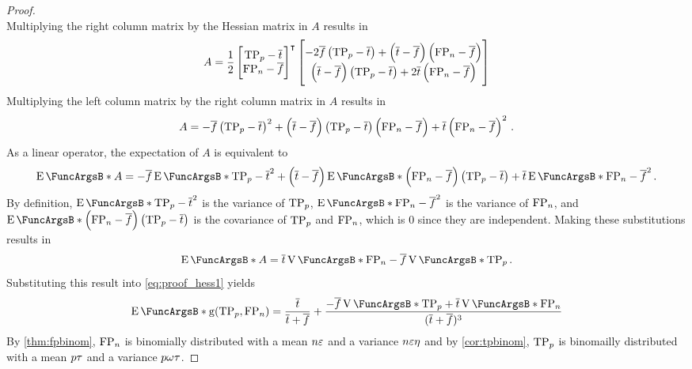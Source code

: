 \documentclass[10pt,final,hidelinks]{article}
\numberwithin{equation}{section}
\begin{document}
{\begin{proof}
\begin{equation}
\end{equation}
Multiplying the right column matrix by the Hessian matrix in $A$ results in
\begin{equation}
    A = \frac{1}{2}
    \begin{bmatrix}
        \mathrm{TP}_p - \overline{t}\\
        \mathrm{FP}_n - \overline{f}
    \end{bmatrix}^{\intercal}
    \begin{bmatrix}
        -2 \overline{f} \left(\mathrm{TP}_p - \overline{t}\right) + \left(\overline{t}-\overline{f}\right)\left(\mathrm{FP}_n - \overline{f}\right)\\
        \left(\overline{t}-\overline{f}\right)\left(\mathrm{TP}_p - \overline{t}\right) + 2 \overline{t}\left(\mathrm{FP}_n - \overline{f}\right)
    \end{bmatrix}
\end{equation}
Multiplying the left column matrix by the right column matrix in $A$ results in
\begin{equation}
    A = -\overline{f} \left(\mathrm{TP}_p - \overline{t}\right)^2 + 
    \left(\overline{t}-\overline{f}\right)\left(\mathrm{TP}_p - 
    \overline{t}\right)\left(\mathrm{FP}_n - \overline{f}\right) + 
    \overline{t}\left(\mathrm{FP}_n - \overline{f}\right)^2\,.
\end{equation}
As a linear operator, the expectation of $A$ is equivalent to
\begin{equation}
\label{eq:proof_of_exp_precision_approx_1}
    \Expect{A} = -\overline{f} \Expect{\TP_p - \overline{t}}^2 + \left(\overline{t}-\overline{f}\right)\Expect{\left(\FP_n - \overline{f}\right)\left(\TP_p - \overline{t}\right)} + \overline{t}\Expect{\FP_n - \overline{f}}^2\,.
\end{equation}
By definition, $\Expect{\TP_p - \overline{t}}^2$ is the variance of $\mathrm{TP}_p$, $\Expect{\FP_n - \overline{f}}^2$ is the variance of $\mathrm{FP}_n$, and $\Expect{\left(\FP_n - \overline{f}\right)\left(\TP_p - \overline{t}\right)}$ is the covariance of $\mathrm{TP}_p$ and $\mathrm{FP}_n$, which is $0$ since they are independent.
Making these substitutions results in
\begin{equation}
    \Expect{A} = \overline{t} \Var{\FP_n} - \overline{f} \Var{\TP_p}\,.
\end{equation}
Substituting this result into \cref{eq:proof_hess1} yields
\begin{equation}
\label{eq:proof_hess2}
    \Expect{\Fun{g}(\TP_p,\FP_n)} = 
    \frac{\overline{t}}{\overline{t}+\overline{f}} + 
    \frac{-\overline{f} \Var{\TP_p} + 
    \overline{t}\Var{\FP_n}}{(\overline{t} + \overline{f})^3}
\end{equation}
By \cref{thm:fpbinom}, $\mathrm{FP}_n$ is binomially distributed with a mean $n \varepsilon$ and a variance $n \varepsilon \eta$ and by \cref{cor:tpbinom}, $\mathrm{TP}_p$ is binomailly distributed with a mean $p \tau$ and a variance $p \omega \tau$.
\end{proof}

}
\end{document}
